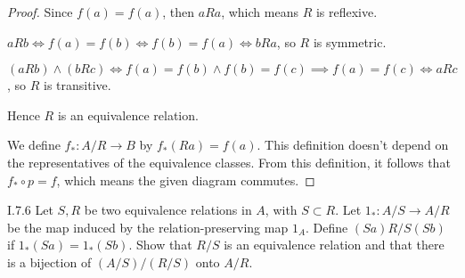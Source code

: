 \begin{proof}
	Since \( f(a) = f(a) \), then \( aRa \), which means \( R \) is reflexive.

	\( aRb \iff f(a) = f(b) \iff f(b) = f(a) \iff bRa \), so \( R \) is symmetric.

	\( (aRb) \land (bRc) \iff f(a) = f(b) \land f(b) = f(c) \implies f(a) = f(c) \iff aRc \), so \( R \) is transitive.

	Hence \( R \) is an equivalence relation.

	We define \( f_{\ast}: A/R \to B \) by \( f_{\ast}(Ra) = f(a) \). This definition doesn't depend on the representatives of the equivalence classes. From this definition, it follows that \( f_{\ast} \circ p = f \), which means the given diagram commutes.
\end{proof}

\begin{problem}{I.7.6}
Let \( S, R \) be two equivalence relations in \( A \), with \( S \subset R \). Let \( 1_{\ast} : A/S \to A/R \) be the map induced by the relation-preserving map \( 1_{A} \). Define \( (Sa) R/S (Sb) \) if \( 1_{\ast}(Sa) = 1_{\ast}(Sb) \). Show that \( R/S \) is an equivalence relation and that there is a bijection of \( (A/S)/(R/S) \) onto \( A/R \).
\end{problem}

